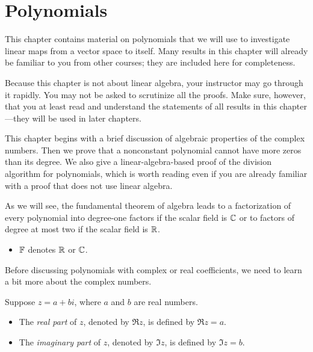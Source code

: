 \chapter{Polynomials}
\renewcommand\thesection{\thechapter}

This chapter contains material on polynomials that we will use to investigate
linear maps from a vector space to itself. Many results in this chapter will
already be familiar to you from other courses; they are included here for
completeness.

Because this chapter is not about linear algebra, your instructor may go
through it rapidly. You may not be asked to scrutinize all the proofs. Make
sure, however, that you at least read and understand the statements of all
results in this chapter---they will be used in later chapters.

This chapter begins with a brief discussion of algebraic properties of the
complex numbers. Then we prove that a nonconstant polynomial cannot have more
zeros than its degree. We also give a linear-algebra-based proof of the
division algorithm for polynomials, which is worth reading even if you are
already familiar with a proof that does not use linear algebra.

As we will see, the fundamental theorem of algebra leads to a factorization of
every polynomial into degree-one factors if the scalar field is $\mathbb{C}$ or to
factors of degree at most two if the scalar field is $\mathbb{R}$.

\begin{definition*}\leavevmode
\begin{itemize}
\item $\mathbb{F}$ denotes $\mathbb{R}$ or $\mathbb{C}$.
\end{itemize}
\end{definition*}

Before discussing polynomials with complex or real coefficients, we need to
learn a bit more about the complex numbers.

\begin{definition}\label{ax:4.1}
Suppose $z=a+bi$, where $a$ and $b$ are real numbers.
\begin{itemize}
\item The \emph{real part} of $z$, denoted by $\Re z$, is defined by
  $\Re z=a$.
\item The \emph{imaginary part} of $z$, denoted by $\Im z$, is defined by
  $\Im z=b$.
\end{itemize}
\end{definition}

